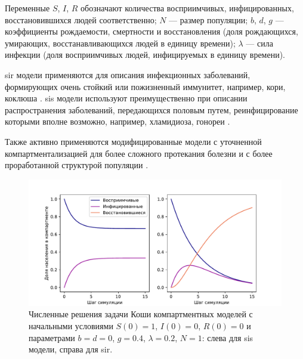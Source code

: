 \documentclass[a4paper,12pt]{article} %
\begin{document}
Переменные $S$, $I$, $R$ обозначают количества восприимчивых, инфицированных, восстановившихся людей соответственно; $N$ --- размер популяции; $b$, $d$, $g$ --- коэффициенты рождаемости, смертности и восстановления (доля рождающихся, умирающих, восстанавливающихся людей в единицу времени); $\lambda$ --- сила инфекции (доля восприимчивых людей, инфицируемых в единицу времени).

\gls{sir} модели применяются для описания инфекционных заболеваний, формирующих очень стойкий или пожизненный иммунитет, например, кори, коклюша \cite{keeling2005networks,kermack1927contribution,anderson1992may,grenfell1992chance,rohani2000impact}. \gls{sis} модели используют преимущественно при описании распространения заболеваний, передающихся половым путем, реинфицирование которыми вполне возможно, например, хламидиоза, гонореи \cite{keeling2005networks,hethcote1984springer,garnett1996sexually}.

Также активно применяются модифицированные модели с уточненной компартментализацией для более сложного протекания болезни \cite{keeling2005networks, anderson1988epidemiology, grenfell2001travelling} и с более проработанной структурой популяции \cite{hethcote1984springer, ghani1997role, keeling1997modelling}.



\begin{figure}[]
    \centering
    \includegraphics[width=\linewidth]{images/compartment.pdf}
    \caption{Численные решения задачи Коши компартментных моделей с начальными условиями $S(0)=1$, $I(0)=0$, $R(0)=0$ и параметрами $b=d=0$, $g=0.4$, $\lambda=0.2$, $N=1$: слева для \gls{sis} модели, справа для \gls{sir}.}
\end{figure}
\end{document}
